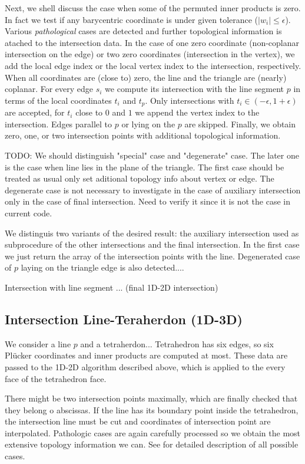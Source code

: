 \documentclass{elsarticle}
\def\abs#1{\left|#1\right|}
\def\abs#1{| #1 |}
\newcommand{\plucker}{Pl\"{u}cker }
\begin{document}
Next, we shell discuss the case when some of the permuted inner products is zero. In fact we test if any barycentric coordinate is under given tolerance 
($\abs{w_i} \le \epsilon$). Various \emph{pathological} cases are detected and further topological 
information is atached to the intersection data.  In the case of one zero coordinate (non-coplanar intersection on the edge)
or two zero coordinates (intersection in the vertex), we add the local edge index or the local vertex index to the intersection, respectively.
When all coordinates are (close to) zero, the line and the triangle are (nearly) coplanar. For every edge $s_i$ we compute
its intersection with the line segment $p$ in terms of the local coordinates $t_i$ and $t_p$. Only intersections with $t_i \in (-\epsilon, 1+\epsilon)$
are accepted, for $t_i$ close to $0$ and $1$ we append the vertex index to the intersection. Edges parallel to $p$ or lying on the $p$ are skipped.
Finally, we obtain zero, one, or two intersection points with additional topological information.


TODO:
We should distinguish "special" case and "degenerate" case. The later one is the case when line lies in the plane of the triangle. The first case should be
treated as usual only set aditional topology info about vertex or edge. The degenerate case is not necessary to investigate in the case of auxiliary
intersection only in the case of final intersection. Need to verify it since it is not the case in current code.


We distinguis two variants of the desired result: the auxiliary intersection used as subprocedure of the other intersections and the final intersection.
In the first case we just return the array of the intersection points with the line.
 Degenerated case of $p$ laying on the triangle edge is also detected....

Intersection with line segment ... (final 1D-2D intersection)

\subsection{Intersection Line-Teraherdon (1D-3D)}
We consider a line $p$ and a tetraherdon...
Tetrahedron has six edges, so six \plucker coordinates and inner products are computed at most. These data are
passed to the 1D-2D algorithm described above, which is applied to the every face of the tetrahedron face. 

There might be two intersection points maximally, which are finally checked that they belong o abscissas.
If the line has its boundary point inside the tetrahedron, the intersection line must be cut
and coordinates of intersection point are interpolated.
Pathologic cases are again carefully processed so we obtain the most extensive topology information we can.
See \cite{fris_dp_2015} for detailed description of all possible cases.
\end{document}
